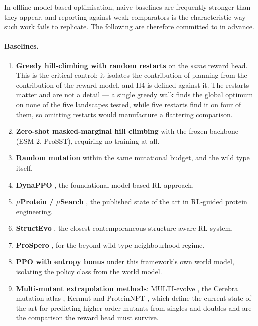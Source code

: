 \documentclass[12pt, a4paper]{article}
\begin{document}
In offline model-based optimisation, naive baselines are frequently stronger than they appear, and reporting against weak comparators is the characteristic way such work fails to replicate. The following are therefore committed to in advance.

\paragraph{Baselines.}
\begin{enumerate}
    \item \textbf{Greedy hill-climbing with random restarts} on the \textit{same} reward head. This is the critical control: it isolates the contribution of planning from the contribution of the reward model, and H4 is defined against it. The restarts matter and are not a detail --- a single greedy walk finds the global optimum on none of the five landscapes tested, while five restarts find it on four of them, so omitting restarts would manufacture a flattering comparison.
    \item \textbf{Zero-shot masked-marginal hill climbing} with the frozen backbone (ESM-2, ProSST), requiring no training at all.
    \item \textbf{Random mutation} within the same mutational budget, and the wild type itself.
    \item \textbf{DynaPPO} \citep{angermueller2020dynappo}, the foundational model-based RL approach.
    \item \textbf{$\mu$Protein / $\mu$Search} \citep{sun2025muprotein}, the published state of the art in RL-guided protein engineering.
    \item \textbf{StructEvo} \citep{nie2026structevo}, the closest contemporaneous structure-aware RL system.
    \item \textbf{ProSpero} \citep{kmicikiewicz2025prospero}, for the beyond-wild-type-neighbourhood regime.
    \item \textbf{PPO with entropy bonus} under this framework's own world model, isolating the policy class from the world model.
    \item \textbf{Multi-mutant extrapolation methods}: MULTI-evolve \citep{tran2026multievolve}, the Cerebra mutation atlas \citep{wang2026atlas}, Kermut \citep{groth2024kermut} and ProteinNPT \citep{notin2023proteinnpt}, which define the current state of the art for predicting higher-order mutants from singles and doubles and are the comparison the reward head must survive.
\end{enumerate}
\end{document}
